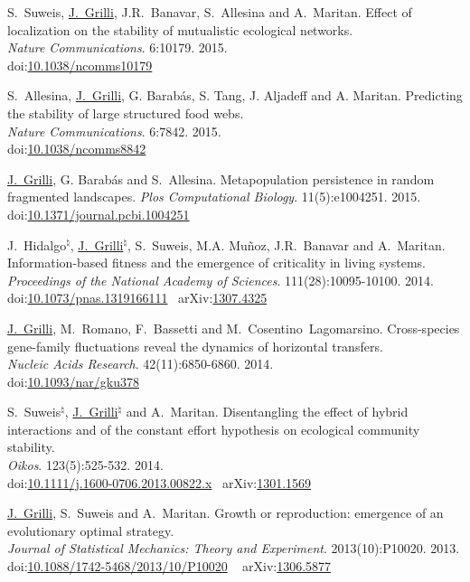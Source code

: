 \documentclass[10pt]{article}
\newcommand\JG{\underline{J.~Grilli}}
\newcommand\doilink[1]{\href{http://dx.doi.org/#1}{#1}}
\newcommand\doi[1]{doi:\doilink{#1}}
\newcommand\pmidlink[1]{\href{http://www.ncbi.nlm.nih.gov/pubmed?term=#1}{#1}}
\newcommand\pmid[1]{pmid:\pmidlink{#1}}
\newcommand\arxivlink[1]{\href{http://arxiv.org/abs/#1}{#1}}
\newcommand\arxiv[1]{arXiv:\arxivlink{#1}}
\begin{document}
\begin{bibenum}
    \item S.~Suweis, \JG, J.R.~Banavar, S.~Allesina and A.~Maritan.
	Effect of localization on the stability of mutualistic ecological networks. \\
    \emph{Nature Communications}. 6:10179. 2015. \\ 
    \doi{10.1038/ncomms10179} \

    \item S.~Allesina, \JG, G. Barab\'as, S. Tang, J. Aljadeff and A. Maritan.
    Predicting the stability of large structured food webs.\\
    \emph{Nature Communications}. 6:7842. 2015. \\
    \doi{10.1038/ncomms8842} \

    \item \JG, G. Barab\'as and S.~Allesina.
    Metapopulation persistence in random fragmented landscapes.
    \emph{Plos Computational Biology}. 11(5):e1004251. 2015. \\
    \doi{10.1371/journal.pcbi.1004251} \

    \item J.~Hidalgo$^\natural$, \JG$^\natural$, S.~Suweis, M.A. Mu\~noz, J.R.~Banavar and A.~Maritan.
	Information-based fitness and the emergence of criticality in living systems. \\
    \emph{Proceedings of the National Academy of Sciences}. 111(28):10095-10100. 2014. \\
    \doi{10.1073/pnas.1319166111} \
	\arxiv{1307.4325}


    \item \JG, M.~Romano, F.~Bassetti and M.~Cosentino~Lagomarsino.
	Cross-species gene-family fluctuations reveal the dynamics of horizontal transfers.\\
	\emph{Nucleic Acids Research}. 42(11):6850-6860. 2014.\\
        \doi{10.1093/nar/gku378} \


    \item S.~Suweis$^\natural$, \JG$^\natural$ and A.~Maritan.
	Disentangling the effect of hybrid interactions and of the constant effort hypothesis on ecological community stability.\\
	\emph{Oikos}. 123(5):525-532. 2014. \\
	\doi{10.1111/j.1600-0706.2013.00822.x} \ 
	\arxiv{1301.1569}


    \item \JG, S.~Suweis and A.~Maritan.
	Growth or reproduction: emergence of an evolutionary optimal strategy. \\
	\emph{Journal of Statistical Mechanics: Theory and Experiment}. 2013(10):P10020. 2013. \\
        \doi{10.1088/1742-5468/2013/10/P10020} \ 
	\arxiv{1306.5877}



\end{bibenum}
\end{document}
